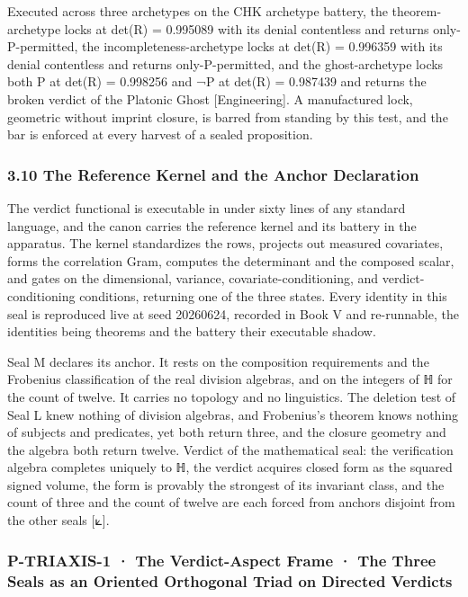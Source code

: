 \documentclass[10pt,twocolumn]{article}
\begin{document}
Executed across three archetypes on the CHK archetype battery, the
theorem-archetype locks at det(R) = 0.995089 with its denial contentless
and returns only-P-permitted, the incompleteness-archetype locks at
det(R) = 0.996359 with its denial contentless and returns
only-P-permitted, and the ghost-archetype locks both P at det(R) =
0.998256 and ¬P at det(R) = 0.987439 and returns the broken verdict of
the Platonic Ghost {[}Engineering{]}. A manufactured lock, geometric
without imprint closure, is barred from standing by this test, and the
bar is enforced at every harvest of a sealed proposition.

\hypertarget{the-reference-kernel-and-the-anchor-declaration}{%
\subsubsection{3.10 The Reference Kernel and the Anchor
Declaration}\label{the-reference-kernel-and-the-anchor-declaration}}

The verdict functional is executable in under sixty lines of any
standard language, and the canon carries the reference kernel and its
battery in the apparatus. The kernel standardizes the rows, projects out
measured covariates, forms the correlation Gram, computes the
determinant and the composed scalar, and gates on the dimensional,
variance, covariate-conditioning, and verdict-conditioning conditions,
returning one of the three states. Every identity in this seal is
reproduced live at seed 20260624, recorded in Book V and re-runnable,
the identities being theorems and the battery their executable shadow.

Seal M declares its anchor. It rests on the composition requirements and
the Frobenius classification of the real division algebras, and on the
integers of ℍ for the count of twelve. It carries no topology and no
linguistics. The deletion test of Seal L knew nothing of division
algebras, and Frobenius's theorem knows nothing of subjects and
predicates, yet both return three, and the closure geometry and the
algebra both return twelve. Verdict of the mathematical seal: the
verification algebra completes uniquely to ℍ, the verdict acquires
closed form as the squared signed volume, the form is provably the
strongest of its invariant class, and the count of three and the count
of twelve are each forced from anchors disjoint from the other seals
{[}⟀{]}.

\hypertarget{p-triaxis-1-the-verdict-aspect-frame-the-three-seals-as-an-oriented-orthogonal-triad-on-directed-verdicts}{%
\subsubsection{P-TRIAXIS-1 · The Verdict-Aspect Frame · The Three Seals
as an Oriented Orthogonal Triad on Directed
Verdicts}\label{p-triaxis-1-the-verdict-aspect-frame-the-three-seals-as-an-oriented-orthogonal-triad-on-directed-verdicts}}
\end{document}
